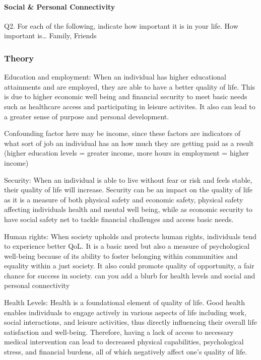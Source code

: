 \documentclass[
]{article}
\begin{document}
\hypertarget{social-personal-connectivity}{%
\paragraph{Social \& Personal
Connectivity}\label{social-personal-connectivity}}

Q2. For each of the following, indicate how important it is in your
life. How important is\ldots{} Family, Friends

\hypertarget{theory}{%
\subsubsection{Theory}\label{theory}}

Education and employment: When an individual has higher educational
attainments and are employed, they are able to have a better quality of
life. This is due to higher economic well being and financial security
to meet basic needs such as healthcare access and participating in
leisure activites. It also can lead to a greater sense of purpose and
personal development.

Confounding factor here may be income, since these factors are
indicators of what sort of job an individual has an how much they are
getting paid as a result (higher education levels = greater income, more
hours in employment = higher income)

Security: When an individual is able to live without fear or risk and
feels stable, their quality of life will increase. Security can be an
impact on the quality of life as it is a measure of both physical safety
and economic safety, physical safety affecting individuals health and
mental well being, while as economic security to have social safety net
to tackle financial challenges and access basic needs.

Human rights: When society upholds and protects human rights,
individuals tend to experience better QoL. It is a basic need but also a
measure of psychological well-being because of its ability to foster
belonging within communities and equality within a just society. It also
could promote quality of opportunity, a fair chance for success in
society. can you add a blurb for health levels and social and personal
connectivity

Health Levels: Health is a foundational element of quality of life. Good
health enables individuals to engage actively in various aspects of life
including work, social interactions, and leisure activities, thus
directly influencing their overall life satisfaction and well-being.
Therefore, having a lack of access to necessary medical intervention can
lead to decreased physical capabilities, psychological stress, and
financial burdens, all of which negatively affect one's quality of life.
\end{document}
